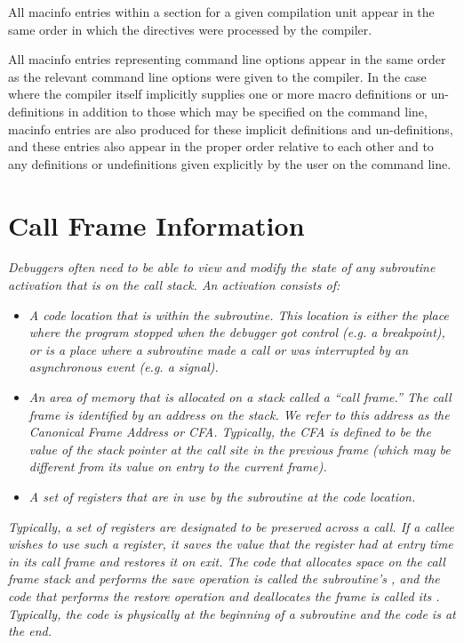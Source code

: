 All macinfo entries within a 
section for a
given compilation unit appear in the same order in which the
directives were processed by the compiler.

All macinfo entries representing command line options appear
in the same order as the relevant command line options
were given to the compiler. In the case where the compiler
itself implicitly supplies one or more macro definitions or
un-definitions in addition to those which may be specified on
the command line, macinfo entries are also produced for these
implicit definitions and un-definitions, and these entries
also appear in the proper order relative to each other and
to any definitions or undefinitions given explicitly by the
user on the command line.


\section{Call Frame Information}
\label{chap:callframeinformation}

\textit{Debuggers often need to be able to view and modify the state of any subroutine activation that is
on the call stack. An activation consists of:}

\begin{itemize}
\item \textit{A code location that is within the
subroutine. This location is either the place where the program
stopped when the debugger got control (e.g. a breakpoint), or
is a place where a subroutine made a call or was interrupted
by an asynchronous event (e.g. a signal).}

\item \textit{An area of memory that is allocated on a stack called a
``call frame.'' The call frame is identified by an address
on the stack. We refer to this address as the Canonical
Frame Address or CFA. Typically, the CFA is defined to be the
value of the stack pointer at the call site in the previous
frame (which may be different from its value on entry to the
current frame).}

\item \textit{A set of registers that are in use by the subroutine
at the code location.}

\end{itemize}

\textit{Typically, a set of registers are designated to be preserved
across a call. If a callee wishes to use such a register, it
saves the value that the register had at entry time in its call
frame and restores it on exit. The code that allocates space
on the call frame stack and performs the save operation is
called the subroutine\textquoteright s , and the code that performs
the restore operation and deallocates the frame is called its
. Typically, the 
 code is physically at the
beginning of a subroutine and the 
 code is at the end.}

